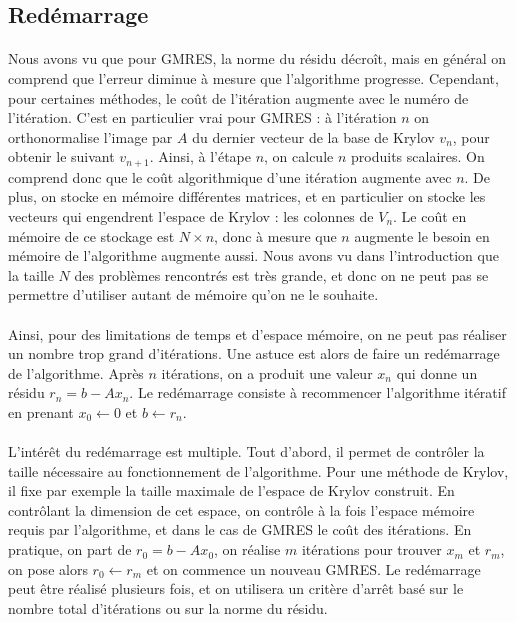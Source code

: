 	\subsection{Redémarrage}

    \paragraph{}
    Nous avons vu que pour GMRES, la norme du résidu décroît, mais en général on comprend que l'erreur diminue à mesure que l'algorithme progresse.
    Cependant, pour certaines méthodes, le coût de l'itération augmente avec le numéro de l'itération.
    C'est en particulier vrai pour GMRES : à l'itération $n$ on orthonormalise l'image par $A$ du dernier vecteur de la base de Krylov $v_n$, pour obtenir le suivant $v_{n+1}$.
    Ainsi, à l'étape $n$, on calcule $n$ produits scalaires.
    On comprend donc que le coût algorithmique d'une itération augmente avec $n$.
    De plus, on stocke en mémoire différentes matrices, et en particulier on stocke les vecteurs qui engendrent l'espace de Krylov : les colonnes de $V_n$.
    Le coût en mémoire de ce stockage est $N\times n$, donc à mesure que $n$ augmente le besoin en mémoire de l'algorithme augmente aussi.
    Nous avons vu dans l'introduction que la taille $N$ des problèmes rencontrés est très grande, et donc on ne peut pas se permettre d'utiliser autant de mémoire qu'on ne le souhaite.

    \paragraph{}
    Ainsi, pour des limitations de temps et d'espace mémoire, on ne peut pas réaliser un nombre trop grand d'itérations.
    Une astuce est alors de faire un redémarrage de l'algorithme.
    Après $n$ itérations, on a produit une valeur $x_n$ qui donne un résidu $r_n = b - Ax_n$.
    Le redémarrage consiste à recommencer l'algorithme itératif en prenant $x_0\leftarrow 0$ et $b\leftarrow r_n$.

    \paragraph{}
    L'intérêt du redémarrage est multiple.
    Tout d'abord, il permet de contrôler la taille nécessaire au fonctionnement de l'algorithme.
    Pour une méthode de Krylov, il fixe par exemple la taille maximale de l'espace de Krylov construit.
    En contrôlant la dimension de cet espace, on contrôle à la fois l'espace mémoire requis par l'algorithme, et dans le cas de GMRES le coût des itérations.
    En pratique, on part de $r_0 = b - Ax_0$, on réalise $m$ itérations pour trouver $x_m$ et $r_m$, on pose alors $r_0 \leftarrow r_m$ et on commence un nouveau GMRES.
    Le redémarrage peut être réalisé plusieurs fois, et on utilisera un critère d'arrêt basé sur le nombre total d'itérations ou sur la norme du résidu.

